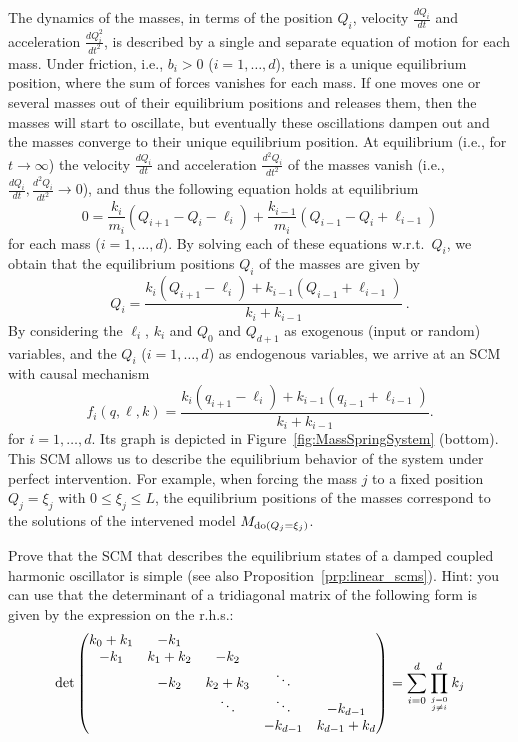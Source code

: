 \begin{Eg}
The dynamics of the masses, in terms of the position $Q_i$, velocity $\frac{dQ_i}{dt}$ and acceleration $\frac{dQ_i^2}{dt^2}$, is described by a single and separate equation of motion for each mass. Under friction, i.e., $b_i>0$ ($i=1,\dots,d$), there is a unique equilibrium position, where the sum of forces vanishes for each mass. If one moves one or several masses out of their equilibrium positions and releases them, then the masses will start to oscillate, but eventually these oscillations dampen out and the masses converge to their unique equilibrium position. At equilibrium (i.e., for $t\to\infty$) the velocity $\frac{dQ_i}{dt}$ and acceleration $\frac{d^2Q_i}{dt^2}$ of the masses vanish (i.e., $\frac{dQ_i}{dt},\frac{d^2Q_i}{dt^2}\to 0$), and thus the following equation holds at equilibrium
$$
  0 = \frac{k_i}{m_i} (Q_{i+1} - Q_i - \ell_i) + \frac{k_{i-1}}{m_i} (Q_{i-1} - Q_i + \ell_{i-1})
$$
for each mass ($i=1,\dots,d$). By solving each of these equations w.r.t.\ $Q_i$, we obtain that the equilibrium positions $Q_i$ of the masses are given by
$$
  Q_i = \frac{k_i(Q_{i+1} - \ell_i) + k_{i-1}(Q_{i-1}+\ell_{i-1})}{k_i + k_{i-1}}\,.
$$
By considering the $\ell_i$, $k_i$ and $Q_0$ and $Q_{d+1}$ as exogenous (input or random) variables, and the
$Q_i$ ($i=1,\dots,d$) as endogenous variables, we arrive at an SCM with causal mechanism
$$
f_i(q,\ell,k) = \frac{k_i(q_{i+1} - \ell_i) + k_{i-1}(q_{i-1}+\ell_{i-1})}{k_i + k_{i-1}}.
$$
for $i=1,\dots,d$.
Its graph is depicted in Figure~\ref{fig:MassSpringSystem} (bottom). This SCM allows us to describe the equilibrium behavior of the system under perfect intervention. For example, when forcing the mass $j$ to a fixed position $Q_j=\xi_j$ with $0\leq \xi_j\leq L$, the equilibrium positions of the masses correspond to the solutions of the intervened model $M_{\operatorname{do}(Q_j=\xi_j)}$. 
\end{Eg}
\begin{Exc}
Prove that the SCM that describes the equilibrium states of a damped coupled harmonic oscillator is simple
(see also Proposition~\ref{prp:linear_scms}). Hint: you can use that the determinant of a tridiagonal matrix of the following
form is given by the expression on the r.h.s.:
  $$\det \begin{pmatrix}
    k_0+k_1 & -k_1       &           &         & \\
    -k_1     & k_1 + k_2 & -k_2       &         & \\
            & -k_2       & k_2 + k_3 & \ddots  & \\
            &           & \ddots    & \ddots  & -k_{d-1} \\
            &           &           & -k_{d-1} & k_{d-1} + k_d \\
  \end{pmatrix} = \sum_{i=0}^d \prod_{j=0 \atop j\ne i}^d k_j
  $$
\end{Exc}

